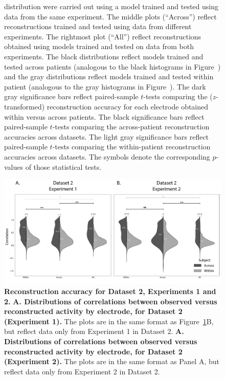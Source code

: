 \documentclass[10pt]{article}
\begin{document}
\begin{figure}[p]
{  distribution were carried out using a model trained and tested using
  data from the same experiment.  The middle plots (``Across'')
  reflect reconstructions trained and tested using data from different
  experiments.  The rightmost plot (``All'') reflect reconstructions
  obtained using models trained and tested on data from both
  experiments.  The black distributions reflect models trained and
  tested across patients (analogous to the black histograms in
  Figure~\corrmaps) and the gray distributions reflect models trained
  and tested within patient (analogous to the gray histograms in
  Figure~\corrmaps).  The dark gray significance bars reflect
  paired-sample $t$-tests comparing the ($z$-transformed)
  reconstruction accuracy for each electrode obtained within versus
  across patients.  The black significance bars reflect paired-sample
  $t$-tests comparing the across-patient reconstruction accuracies
  across datasets.  The light gray significance bars reflect
  paired-sample $t$-tests comparing the within-patient reconstruction
  accuracies across datasets.  The symbols denote the corresponding
  $p$-values of those statistical tests.}
\label{fig:supplemental_1}
\end{figure}


\begin{figure}[p]
\centering
\includegraphics[width=\textwidth]{figs/supplemental_2}
\caption{\textbf{Reconstruction accuracy for Dataset 2, Experiments 1
    and 2.}  \textbf{A. Distributions of correlations between observed
    versus reconstructed activity by electrode, for Dataset 2
    (Experiment 1).}  The plots are in the same format as
  Figure~\ref{fig:supplemental_1}B, but reflect data only from
  Experiment 1 in Dataset 2.  \textbf{A. Distributions of correlations between observed
    versus reconstructed activity by electrode, for Dataset 2
    (Experiment 2).}  The plots are in the same format as Panel A, but
    reflect data only from Experiment 2 in Dataset 2.}
\label{fig:supplemental_2}
\end{figure}
\end{document}
